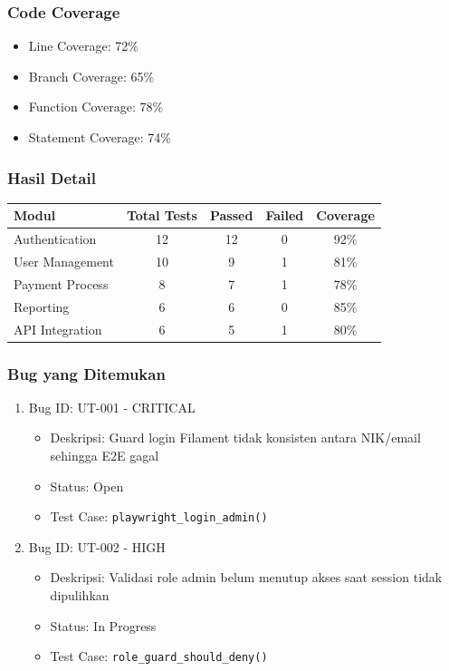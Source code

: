 \documentclass[12pt,a4paper]{article}
\begin{document}
\subsubsection{Code Coverage}
\begin{itemize}
  \item Line Coverage: 72\%
  \item Branch Coverage: 65\%
  \item Function Coverage: 78\%
  \item Statement Coverage: 74\%
\end{itemize}

\subsubsection{Hasil Detail}
\begin{tabularx}{\textwidth}{@{}lcccc@{}}
\toprule
Modul & Total Tests & Passed & Failed & Coverage \\
\midrule
Authentication & 12 & 12 & 0 & 92\% \\
User Management & 10 & 9 & 1 & 81\% \\
Payment Process & 8 & 7 & 1 & 78\% \\
Reporting & 6 & 6 & 0 & 85\% \\
API Integration & 6 & 5 & 1 & 80\% \\
\bottomrule
\end{tabularx}

\subsubsection{Bug yang Ditemukan}
\begin{enumerate}
  \item Bug ID: UT-001 - CRITICAL
  \begin{itemize}
    \item Deskripsi: Guard login Filament tidak konsisten antara NIK/email sehingga E2E gagal
    \item Status: Open
    \item Test Case: \texttt{playwright\_login\_admin()}
  \end{itemize}
  \item Bug ID: UT-002 - HIGH
  \begin{itemize}
    \item Deskripsi: Validasi role admin belum menutup akses saat session tidak dipulihkan
    \item Status: In Progress
    \item Test Case: \texttt{role\_guard\_should\_deny()}
  \end{itemize}
\end{enumerate}
\end{document}
